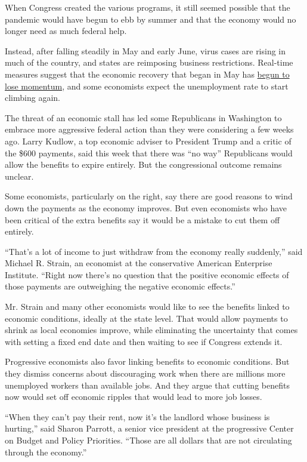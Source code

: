 When Congress created the various programs, it still seemed possible
that the pandemic would have begun to ebb by summer and that the economy
would no longer need as much federal help.

Instead, after falling steadily in May and early June, virus cases are
rising in much of the country, and states are reimposing business
restrictions. Real-time measures suggest that the economic recovery that
began in May has
\href{https://www.nytimes.com/live/2020/07/15/business/stock-market-today-coronavirus\#surging-virus-cases-and-renewed-lockdowns-threaten-economic-recovery}{begun
to lose momentum}, and some economists expect the unemployment rate to
start climbing again.

The threat of an economic stall has led some Republicans in Washington
to embrace more aggressive federal action than they were considering a
few weeks ago. Larry Kudlow, a top economic adviser to President Trump
and a critic of the \$600 payments, said this week that there was ``no
way'' Republicans would allow the benefits to expire entirely. But the
congressional outcome remains unclear.

Some economists, particularly on the right, say there are good reasons
to wind down the payments as the economy improves. But even economists
who have been critical of the extra benefits say it would be a mistake
to cut them off entirely.

``That's a lot of income to just withdraw from the economy really
suddenly,'' said Michael R. Strain, an economist at the conservative
American Enterprise Institute. ``Right now there's no question that the
positive economic effects of those payments are outweighing the negative
economic effects.''

Mr. Strain and many other economists would like to see the benefits
linked to economic conditions, ideally at the state level. That would
allow payments to shrink as local economies improve, while eliminating
the uncertainty that comes with setting a fixed end date and then
waiting to see if Congress extends it.

Progressive economists also favor linking benefits to economic
conditions. But they dismiss concerns about discouraging work when there
are millions more unemployed workers than available jobs. And they argue
that cutting benefits now would set off economic ripples that would lead
to more job losses.

``When they can't pay their rent, now it's the landlord whose business
is hurting,'' said Sharon Parrott, a senior vice president at the
progressive Center on Budget and Policy Priorities. ``Those are all
dollars that are not circulating through the economy.''

